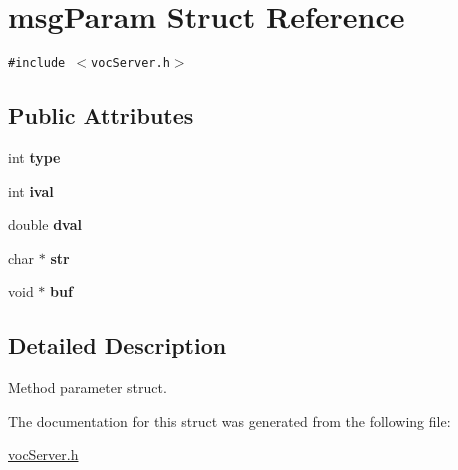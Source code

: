 \hypertarget{structmsgParam}{
\section{msgParam Struct Reference}
\label{structmsgParam}
}
{\tt \#include $<$vocServer.h$>$}

\subsection*{Public Attributes}
\begin{CompactItemize}
\item 
\hypertarget{structmsgParam_3ad235045496a3468d2244a83d3066b0}{
int \textbf{type}}
\label{structmsgParam_3ad235045496a3468d2244a83d3066b0}

\item 
\hypertarget{structmsgParam_b368ee31366fc2b0b40568bbb4184974}{
int \textbf{ival}}
\label{structmsgParam_b368ee31366fc2b0b40568bbb4184974}

\item 
\hypertarget{structmsgParam_a5ed42ab5124bc794255f84831fd9566}{
double \textbf{dval}}
\label{structmsgParam_a5ed42ab5124bc794255f84831fd9566}

\item 
\hypertarget{structmsgParam_eff79df978a95da3449cb64a21b88580}{
char $\ast$ \textbf{str}}
\label{structmsgParam_eff79df978a95da3449cb64a21b88580}

\item 
\hypertarget{structmsgParam_8cef5c322bb25e168dc3b5f4870cac31}{
void $\ast$ \textbf{buf}}
\label{structmsgParam_8cef5c322bb25e168dc3b5f4870cac31}

\end{CompactItemize}


\subsection{Detailed Description}
Method parameter struct. 

The documentation for this struct was generated from the following file:\begin{CompactItemize}
\item 
\hyperlink{vocServer_8h}{vocServer.h}\end{CompactItemize}
